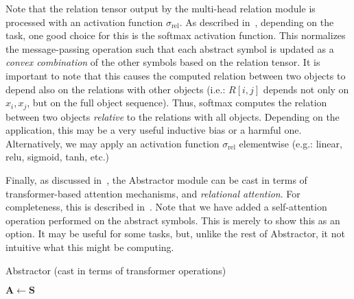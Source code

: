 Note that the relation tensor output by the multi-head relation module is processed with an activation function $\sigma_{\mathrm{rel}}$. As described in~, depending on the task, one good choice for this is the softmax activation function. This normalizes the message-passing operation such that each abstract symbol is updated as a \textit{convex combination} of the other symbols based on the relation tensor. It is important to note that this causes the computed relation between two objects to depend also on the relations with other objects (i.e.: $R[i,j]$ depends not only on $x_i, x_j$, but on the full object sequence). Thus, softmax computes the relation between two objects \textit{relative} to the relations with all objects. Depending on the application, this may be a very useful inductive bias or a harmful one. Alternatively, we may apply an activation function $\sigma_{\mathrm{rel}}$ elementwise (e.g.: linear, relu, sigmoid, tanh, etc.)

Finally, as discussed in~, the Abstractor module can be cast in terms of transformer-based attention mechanisms, and \textit{relational attention}. For completeness, this is described in~. Note that we have added a self-attention operation performed on the abstract symbols. This is merely to show this as an option. It may be useful for some tasks, but, unlike the rest of Abstractor, it not intuitive what this might be computing.

\begin{algorithm}[th!]
    \caption{Abstractor (cast in terms of transformer operations)}\label{alg:relational_abstractor}


    \vspace{1em}

    $\bm{A} \gets \bm{S}$

\end{algorithm}
